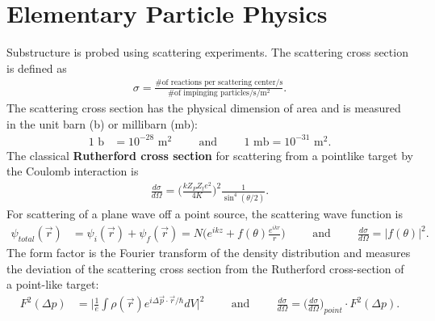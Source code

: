 \section{Elementary Particle Physics}
Substructure is probed using scattering experiments. The scattering cross section is defined as
\begin{align}
\sigma = \frac{\textrm{\# of reactions per scattering center/s}}{\textrm{\# of impinging particles/s/m$^2$}}.
\end{align}
The scattering cross section has the physical dimension of area and is measured in the unit barn (b) or millibarn (mb):
\begin{align}
1 \textrm{ b} &= 10^{-28} \textrm{ m}^2\hspace{1cm}\textrm{and}\hspace{1cm}
1 \textrm{ mb} = 10^{-31} \textrm{ m}^2.
\end{align}
The classical \textbf{Rutherford cross section} for scattering from a pointlike target by the Coulomb interaction is
\begin{align}
\frac{d \sigma}{d \Omega}=\bigg(\frac{kZ_PZ_te^2}{4K} \bigg)^2\frac{1}{\sin^4(\theta/2)}.
\end{align}
For scattering of a plane wave off a point source, the scattering wave function is
\begin{align}
\psi_{total}(\vec{r})&=\psi_i(\vec{r})+\psi_f(\vec{r})
=N\bigg(e^{ikz}+f(\theta)\frac{e^{ikr}}{r} \bigg) \hspace{1cm}\textrm{and}\hspace{1cm}
\frac{d \sigma}{d \Omega}=|f(\theta)|^2.
\end{align}
The form factor is the Fourier transform of the density distribution and measures the deviation of the scattering cross section from the Rutherford cross-section of a point-like target:
\begin{align}
F^2(\Delta p)&= \bigg|\frac{1}{e}\int\rho(\vec{r})e^{i\Delta \vec{p} \cdot \vec{r}/\hbar}dV\bigg|^2\hspace{1cm}\textrm{and}\hspace{1cm}
\frac{d \sigma}{d \Omega}= \bigg(\frac{d \sigma}{d \Omega} \bigg)_{point} \cdot F^2(\Delta p).
\end{align}

